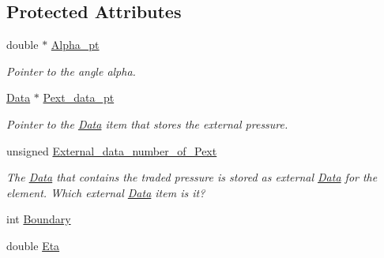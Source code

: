 \subsection*{Protected Attributes}
\begin{DoxyCompactItemize}
\item 
double $\ast$ \hyperlink{classoomph_1_1PolarNavierStokesTractionElement_a3d3d555530a4d6f3289b4f5408565dc6}{Alpha\+\_\+pt}
\begin{DoxyCompactList}\small\item\em Pointer to the angle alpha. \end{DoxyCompactList}\item 
\hyperlink{classoomph_1_1Data}{Data} $\ast$ \hyperlink{classoomph_1_1PolarNavierStokesTractionElement_a83ef22f25305baa91fd8a26d5e62ddbd}{Pext\+\_\+data\+\_\+pt}
\begin{DoxyCompactList}\small\item\em Pointer to the \hyperlink{classoomph_1_1Data}{Data} item that stores the external pressure. \end{DoxyCompactList}\item 
unsigned \hyperlink{classoomph_1_1PolarNavierStokesTractionElement_a58a8649d507efb205d2abbad55c31f57}{External\+\_\+data\+\_\+number\+\_\+of\+\_\+\+Pext}
\begin{DoxyCompactList}\small\item\em The \hyperlink{classoomph_1_1Data}{Data} that contains the traded pressure is stored as external \hyperlink{classoomph_1_1Data}{Data} for the element. Which external \hyperlink{classoomph_1_1Data}{Data} item is it? \end{DoxyCompactList}\item 
int \hyperlink{classoomph_1_1PolarNavierStokesTractionElement_a2dd4f7011ef970c4849ec9c6ad10373d}{Boundary}
\item 
double \hyperlink{classoomph_1_1PolarNavierStokesTractionElement_ae80d473cf67d10d4ffe7e3124a9ffce9}{Eta}
\end{DoxyCompactItemize}
